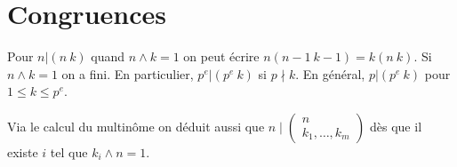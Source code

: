 \documentclass[a4paper,12pt]{book}
\theoremstyle{plain}
\theoremstyle{definition}
\theoremstyle{remark}
\begin{document}
\section{Congruences}
Pour $n|(n~k)$ quand $n\wedge k=1$ on peut
écrire $n(n-1~k-1)=k(n~k)$. Si $n\wedge k=1$ on
a fini. En particulier, $p^e|(p^e~k)$ si $p\nmid k$.
En général, $p|(p^e~k)$ pour $1\leq k\leq p^e$.

Via le calcul du multinôme on déduit aussi que
$n\mid \begin{pmatrix}n\\k_1,\ldots,k_m\end{pmatrix}$
dès que il existe $i$ tel que $k_i\wedge n=1$.




\printbibliography
\end{document}
